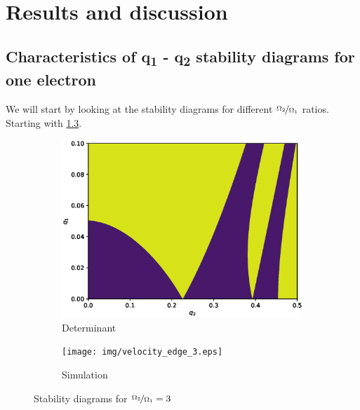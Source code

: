 \chapter{Results and discussion}

\section{Characteristics of q\textsubscript{1} - q\textsubscript{2} stability diagrams for one electron}


We will start by looking at the stability diagrams for different $\nicefrac{\Omega_2}{\Omega_1}$ ratios. Starting with \ref{fig:stabil-eta=3}.

\begin{figure}[H]
\begin{subfigure}{.5\textwidth}
  \centering
  \includegraphics[width=\linewidth]{img/q1_0.0-0.1_q2_0.0-0.5_1200x1200_3.eps}
  \caption{Determinant}
  \label{fig:det_3}
\end{subfigure}%
\begin{subfigure}{.5\textwidth}
  \centering
  \texttt{[image: img/velocity\_edge\_3.eps]}  
  \caption{Simulation}
  \label{fig:sim_3}
\end{subfigure}
\caption{Stability diagrams for $\nicefrac{\Omega_2}{\Omega_1} = 3$}
\label{fig:stabil-eta=3}
\end{figure}

